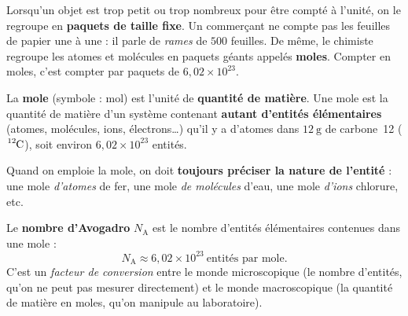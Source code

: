 \documentclass[11pt,a4paper]{article}
\newcommand{\NA}{N_{\!\text{A}}}
\begin{document}
Lorsqu'un objet est trop petit ou trop nombreux pour être compté à l'unité, on le regroupe en
\textbf{paquets de taille fixe}. Un commerçant ne compte pas les feuilles de papier une à une : il
parle de \emph{rames} de $500$ feuilles. De même, le chimiste regroupe les atomes et molécules en
paquets géants appelés \textbf{moles}. Compter en moles, c'est compter par paquets de
$6{,}02\times10^{23}$.

\begin{definition}[la mole]
La \textbf{mole} (symbole : \si{\mole}) est l'unité de \textbf{quantité de matière}. Une mole est
la quantité de matière d'un système contenant \textbf{autant d'entités élémentaires} (atomes,
molécules, ions, électrons\ldots) qu'il y a d'atomes dans $\SI{12}{\gram}$ de carbone~12 ($\ce{^{12}C}$),
soit environ $6{,}02\times10^{23}$ entités.

\smallskip
Quand on emploie la mole, on doit \textbf{toujours préciser la nature de l'entité} : une mole
\emph{d'atomes} de fer, une mole \emph{de molécules} d'eau, une mole \emph{d'ions} chlorure, etc.
\end{definition}

\begin{definition}
Le \textbf{nombre d'Avogadro} $\NA$ est le nombre d'entités élémentaires contenues dans une mole :
\[ \NA \approx 6{,}02\times10^{23}\ \text{entités par mole}. \]
C'est un \emph{facteur de conversion} entre le monde microscopique (le nombre d'entités, qu'on ne
peut pas mesurer directement) et le monde macroscopique (la quantité de matière en moles, qu'on
manipule au laboratoire).
\end{definition}

\begin{center}
\end{center}
\end{document}
